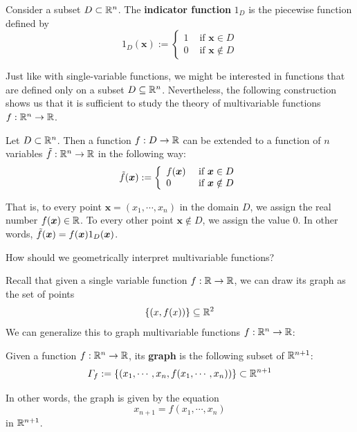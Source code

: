\begin{definition}
    Consider a subset $D \subset \mathbb{R}^n$.  The \textbf{indicator function} $1_D$ is the piecewise function defined by
    $$1_D(\bm{x}) := \left\{
		\begin{array}{ll}
			1 & \text{ if } \bm{x} \in D \\
			0 & \text{ if } \bm{x} \notin D
		\end{array}
		\right.$$
    
    \end{definition}



Just like with single-variable functions, we might be interested in functions that are defined only on a subset $D \subseteq \mathbb{R}^n$.  Nevertheless, the following construction shows us that it is sufficient to study the theory of multivariable functions $f : \mathbb{R}^n \to \mathbb{R}$.

\begin{example}
Let $D \subset \mathbb{R}^n$.  Then a function $f : D \to \mathbb{R}$ can be extended to a function of $n$ variables $\Tilde{f} : \mathbb{R}^n \to \mathbb{R}$ in the following way:
$$\Tilde{f}(\bm{x}) := \left\{
		\begin{array}{ll}
			f(\bm{x}) & \text{ if } \bm{x} \in D \\
			0 & \text{ if } \bm{x} \notin D
		\end{array}
		\right.$$

That is, to every point $\bm{x}=(x_1,\cdots,x_n)$ in the domain $D$, we assign the real number $f(\bm{x}) \in \mathbb{R}$.  To every other point $\bm{x} \notin D$, we assign the value $0$.  In other words,  $\Tilde{f}(\bm{x}) = f(\bm{x})1_D(\bm{x})$.  

\end{example}

\begin{motivating}
How should we geometrically interpret multivariable functions?
\end{motivating}

Recall that given a single variable function $f: \mathbb{R} \to \mathbb{R}$, we can draw its graph as the set of points $$\{(x, f(x)) \} \subseteq \mathbb{R}^2$$  We can generalize this to graph multivariable functions $f : \mathbb{R}^n \to \mathbb{R}$:

\begin{definition}\label{def:graph}
Given a function $f: \mathbb{R}^n \to \mathbb{R}$, its \textbf{graph} is the following subset of $\mathbb{R}^{n+1}$:
$$\Gamma_f := \{(x_1,\cdots, x_n,f(x_1, \cdots, x_n)) \} \subset \mathbb{R}^{n+1}$$ 

In other words, the graph is given by the equation $$x_{n+1} = f(x_1, \cdots, x_n)$$ in $\mathbb{R}^{n+1}$.
\end{definition}

